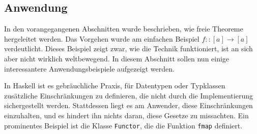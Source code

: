 

\subsection{Anwendung}



In den vorangegangenen Abschnitten wurde beschrieben, wie freie Theoreme hergeleitet werden. Das Vorgehen wurde am einfachen
Beispiel $f :: [a] \rightarrow [a]$ verdeutlicht. Dieses Beispiel zeigt zwar, wie die Technik funktioniert, ist an sich aber nicht wirklich
weltbewegend. In diesem Abschnitt sollen nun einige interessantere Anwendungsbeispiele aufgezeigt werden.

In Haskell ist es gebräuchliche Praxis, für Datentypen oder Typklassen zusätzliche Einschränkungen zu definieren, die nicht durch
die Implementierung sichergestellt werden. Stattdessen liegt es am Anwender, diese Einschränkungen einzuhalten, und es hindert
ihn nichts daran, diese Gesetze zu missachten. Ein prominentes Beispiel ist die Klasse \texttt{Functor}, die die Funktion
\texttt{fmap} definiert.


